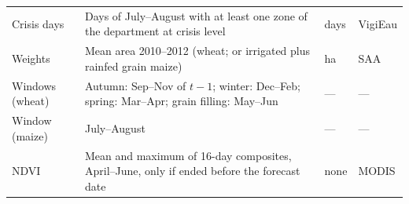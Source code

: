 \begin{table}[H]
\begin{tabular}{>{\raggedright}p{3.2cm}>{\raggedright}p{6.9cm}>{\raggedright}p{1.6cm}>{\raggedright\arraybackslash}p{2.1cm}}
Crisis days & Days of July--August with at least one zone of the department at crisis level & days & VigiEau \\
Weights & Mean area 2010--2012 (wheat; or irrigated plus rainfed grain maize) & ha & SAA \\
Windows (wheat) & Autumn: Sep--Nov of $t-1$; winter: Dec--Feb; spring: Mar--Apr; grain filling: May--Jun & --- & --- \\
Window (maize) & July--August & --- & --- \\
NDVI & Mean and maximum of 16-day composites, April--June, only if ended before the forecast date & none & MODIS \\
\bottomrule
\end{tabular}
\end{table}
